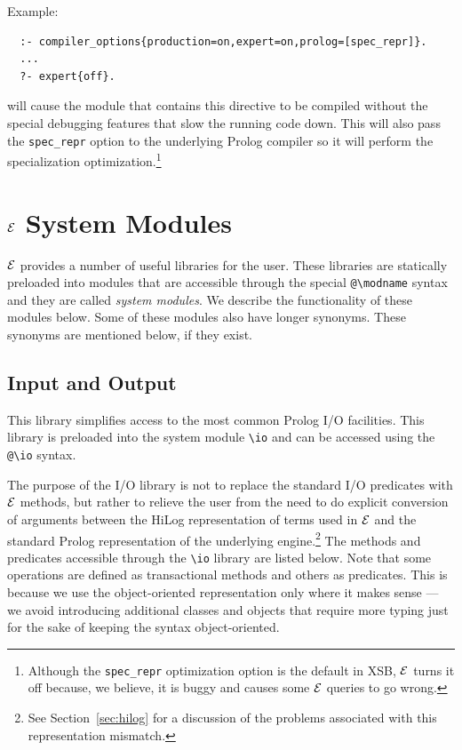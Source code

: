 \documentclass[11pt]{article}
\newcommand{\ERGO}{\mbox{\ensuremath{\cal{E}}\smaller{{\sc{RGO}}}}\xspace}
\newcommand{\FLSYSTEM}{\ERGO}
\newcommand{\bs}{\textbackslash}
\begin{document}
Example:
\begin{verbatim}
  :- compiler_options{production=on,expert=on,prolog=[spec_repr]}.
  ...
  ?- expert{off}.
\end{verbatim}
will cause the module that contains this directive to be compiled without
the special debugging features that slow the running code down. This will
also pass the \texttt{spec\_repr} option to the underlying Prolog compiler
so  it will perform the specialization optimization.\footnote{
  Although the \texttt{spec\_repr} optimization option is the default in
  XSB, \FLSYSTEM turns it off because, we believe, it is buggy and causes some
  \FLSYSTEM queries to go wrong.
  }


\section{\FLSYSTEM System Modules}\label{sec-service-libs}

\FLSYSTEM provides a number of useful libraries for the user.
These libraries are statically preloaded into modules that are accessible
through the special {\tt @\bs{}modname} syntax and they are called
\emph{system modules}.  We describe the functionality of these modules
below. Some of these modules also have longer synonyms.
These synonyms are mentioned below, if they exist.

\subsection{Input and Output}\label{sec-io-mod}

This library simplifies access to the most common Prolog I/O facilities.
This library is preloaded into the system module {\tt \bs{}io} and
can be accessed using the {\tt @\bs{}io} syntax.

The purpose of the I/O library is not to replace the standard I/O predicates
with \FLSYSTEM methods, but rather to relieve the user from the need to do
explicit conversion of arguments between the HiLog representation of terms
used in \FLSYSTEM and the standard Prolog representation of the underlying
engine.\footnote{
  See Section~\ref{sec:hilog} for a discussion of the problems associated
  with this representation mismatch.
  }
The methods and predicates accessible through the {\tt \bs{}io} library are
listed below.  Note that some operations are defined as transactional methods
and others as predicates. This is because we use the object-oriented
representation only where it makes sense --- we avoid introducing
additional classes and objects that require more typing just for the sake
of keeping the syntax object-oriented.
\end{document}
